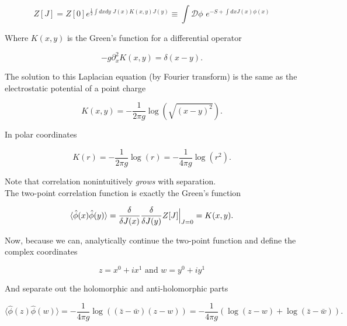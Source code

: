 \begin{equation}
Z[J] = Z[0] e^{\frac{1}{2} \int dx dy \,\, J(x) K(x,y) J(y)} \equiv \int \mathcal{D} \phi \,\, e^{-S + \int dx J(x) \phi (x)}
\end{equation}

\noindent Where $K(x,y)$ is the Green's function for a differential operator

\begin{equation}
-g \partial_x^2 K(x,y) = \delta (x-y).
\end{equation}

\noindent The solution to this Laplacian equation (by Fourier transform) is the same as the electrostatic potential of a point charge

\begin{equation}
K(x,y) = - \frac{1}{2\pi g} \log (\sqrt{(x-y)^2}).
\end{equation}

\noindent In polar coordinates

\begin{equation}
K(r) = -\frac{1}{2\pi g} \log (r) = -\frac{1}{4 \pi g} \log (r^2).
\end{equation}

\noindent Note that correlation nonintuitively \textit{grows} with separation. \\

\noindent The two-point correlation function is exactly the Green's function

\begin{equation}
\langle \hat{\phi} (x) \hat{\phi} (y) \rangle = \frac{\delta}{\delta J(x)} \frac{\delta}{\delta J(y)} Z[J] \Big{|}_{J=0} = K(x,y).
\end{equation}

\noindent Now, because we can, analytically continue the two-point function and define the complex coordinates

\begin{equation}
z = x^0 + i x^1 \text{ and } w = y^0 + i y^1
\end{equation}

\noindent And separate out the holomorphic and anti-holomorphic parts

\begin{equation}
\langle \hat{\phi} (z) \hat{\phi} (w) \rangle = - \frac{1}{4 \pi g} \log ((\bar{z} - \bar{w}) (z-w)) = -\frac{1}{4 \pi g} (\log (z-w) + \log (\bar{z} - \bar{w})).
\end{equation}

